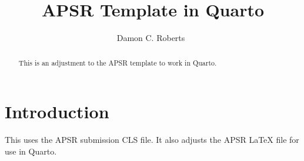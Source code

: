 \documentclass[biblatex,blind]{C:/Users/damon/Dropbox/templates/manuscripts/apsr_submission}
\title{APSR Template in Quarto}
\author{Damon C. Roberts~\orcidlink{0000-0002-4360-3675}}
        {University of Colorado Boulder}
        {{Corresponding author. Email: \url{damon.roberts-1@colorado.edu} \\}{Replication materials: \url{https://github.com/DamonCharlesRoberts}}}
\begin{document}
\begin{frontmatter}
\begin{abstract}
    This is an adjustment to the APSR template to work in Quarto.
\end{abstract}
\end{frontmatter}
\setcounter{page}{0}
\thispagestyle{empty}
\newpage

\hypertarget{introduction}{%
\section{Introduction}\label{introduction}}

This uses the APSR submission CLS file. It also adjusts the APSR LaTeX
file for use in Quarto.

%

\newpage
\printbibliography
\newpage
\theendnotes
\end{document}
